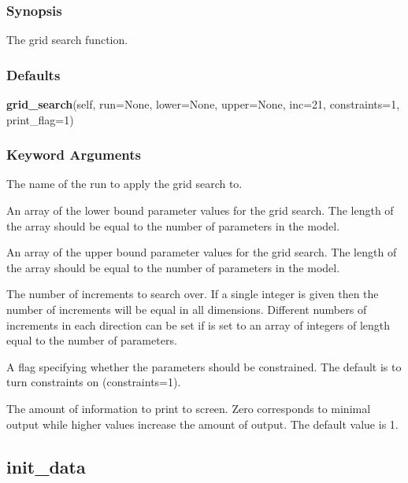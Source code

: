   
 \subsubsection{Synopsis} 

 The grid search function. 
  

  
 \subsubsection{Defaults} 

 \textsf{\textbf{grid\_search}(self, run=None, lower=None, upper=None, inc=21, constraints=1, print\_flag=1)} 

  
 \subsubsection{Keyword Arguments} 

   The name of the run to apply the grid search to.   

   An array of the lower bound parameter values for the grid search.  The length of the array should be equal to the number of parameters in the model.   

   An array of the upper bound parameter values for the grid search.  The length of the array should be equal to the number of parameters in the model.   

   The number of increments to search over.  If a single integer is given then the number of increments will be equal in all dimensions.  Different numbers of increments in each direction can be set if  is set to an array of integers of length equal to the number of parameters.   

   A flag specifying whether the parameters should be constrained.  The default is to turn constraints on (constraints=1).   

   The amount of information to print to screen.  Zero corresponds to minimal output while higher values increase the amount of output.  The default value is 1.  

  

  

 \newpage 

 \subsection{init\_data} 

